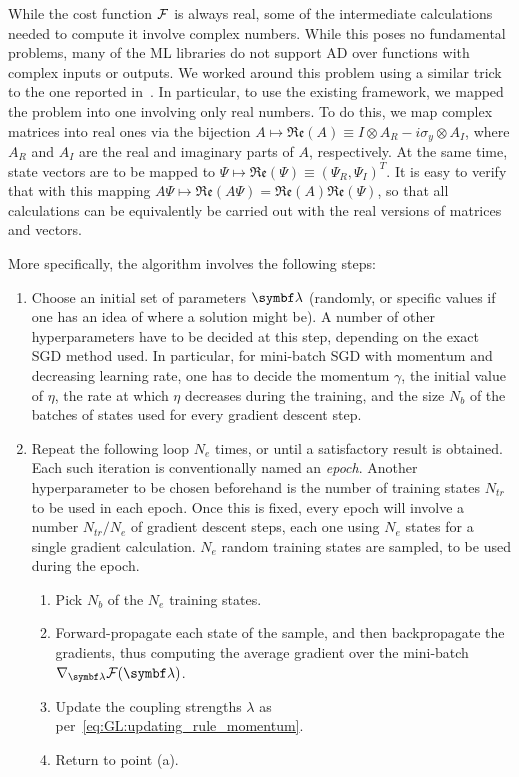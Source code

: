 While the cost function ${\mathcal{F}}$ is always real, some of the intermediate calculations needed to compute it involve complex numbers.
While this poses no fundamental problems, many of the \ac{ML} libraries do not support \ac{AD} over functions with complex inputs or outputs.
We worked around this problem using a similar trick to the one reported in~\cite{leung2017speedup}.
In particular, to use the existing framework, we mapped the problem into one involving only real numbers.
To do this, we map complex matrices into real ones via the bijection
$A\mapsto\mathfrak{Re}(A)\equiv I \otimes A_{R} - i \sigma_y\otimes A_{I}$,
where $A_R$ and $A_I$ are the real and imaginary parts of $A$, respectively.
At the same time, state vectors are to be mapped to
$\Psi\mapsto\mathfrak{Re}(\Psi)\equiv(\Psi_R, \Psi_I)^T$.
It is easy to verify that with this mapping
$A\Psi\mapsto\mathfrak{Re}(A\Psi)=\mathfrak{Re}(A)\mathfrak{Re}(\Psi)$,
so that all calculations can be equivalently be carried out with the real versions of matrices and vectors.

More specifically, the algorithm involves the following steps:
\begin{enumerate}
	\item Choose an initial set of parameters $\bslambda$ (randomly, or specific values if one has an idea of where a solution might be).
	A number of other hyperparameters have to be decided at this step, depending on the exact \ac{SGD} method used. In particular, for mini-batch \ac{SGD} with momentum and decreasing learning rate, one has to decide the momentum $\gamma$, the initial value of $\eta$, the rate at which $\eta$ decreases during the training, and the size $N_b$ of the batches of states used for every gradient descent step.
	\item Repeat the following loop $N_e$ times, or until a satisfactory result is obtained.
	Each such iteration is conventionally named an \emph{epoch}.
	Another hyperparameter to be chosen beforehand is the number of training states $N_{tr}$ to be used in each epoch.
	Once this is fixed, every epoch will involve a number $N_{tr}/N_e$ of gradient descent steps, each one using $N_e$ states for a single gradient calculation.
	$N_e$ random training states are sampled, to be used during the epoch.
	\begin{enumerate}
		\item Pick $N_b$ of the $N_e$ training states.
		\item Forward-propagate each state of the sample, and then backpropagate the gradients, thus computing the average gradient over the mini-batch $\grad_{\bslambda} \calF(\bslambda)$.
		\item Update the coupling strengths $\lambda$ as per~\cref{eq:GL:updating_rule_momentum}.
		\item Return to point (a).
	\end{enumerate}
\end{enumerate}


